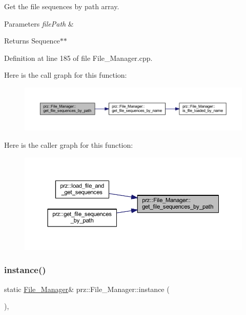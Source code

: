 Get the file sequences by path array. 


\begin{DoxyParams}{Parameters}
{\em file\+Path} & \\
\hline
\end{DoxyParams}
\begin{DoxyReturn}{Returns}
Sequence$\ast$$\ast$ 
\end{DoxyReturn}


Definition at line 185 of file File\+\_\+\+Manager.\+cpp.

Here is the call graph for this function\+:
\nopagebreak
\begin{figure}[H]
\begin{center}
\leavevmode
\includegraphics[width=350pt]{classprz_1_1_file___manager_a75c22ac120dc18a061d5c2c68f965d0b_cgraph}
\end{center}
\end{figure}
Here is the caller graph for this function\+:
\nopagebreak
\begin{figure}[H]
\begin{center}
\leavevmode
\includegraphics[width=350pt]{classprz_1_1_file___manager_a75c22ac120dc18a061d5c2c68f965d0b_icgraph}
\end{center}
\end{figure}
\mbox{\label{classprz_1_1_file___manager_a01f8e98b44d904709af8ec7f9bf91f3a}} 
\subsubsection{\texorpdfstring{instance()}{instance()}}
{\footnotesize\ttfamily static \mbox{\hyperlink{classprz_1_1_file___manager}{File\+\_\+\+Manager}}\& prz\+::\+File\+\_\+\+Manager\+::instance (\begin{DoxyParamCaption}{ }\end{DoxyParamCaption})\hspace{0.3cm}{\ttfamily [inline]}, {\ttfamily [static]}}



